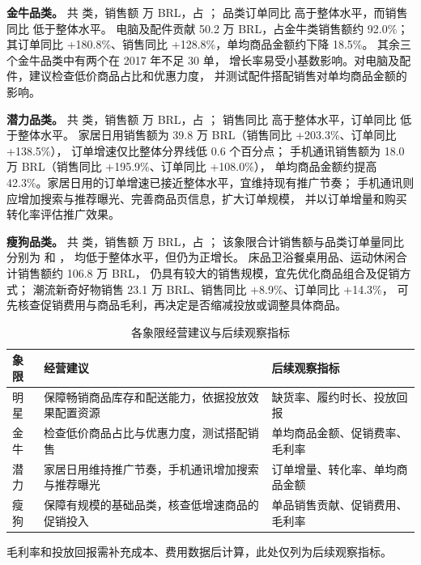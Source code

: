 \documentclass[11pt,a4paper]{ctexart}
\begin{document}
\noindent\textbf{金牛品类。}
共 \CowCount{} 类，销售额 \CowSales{} 万 BRL，占 \CowShare{}；
品类订单同比 \CowOrderGrowth{} 高于整体水平，而销售同比 \CowSalesGrowth{} 低于整体水平。
电脑及配件贡献 50.2 万 BRL，占金牛类销售额约 92.0\%；
其订单同比 +180.8\%、销售同比 +128.8\%，单均商品金额约下降 18.5\%。
其余三个金牛品类中有两个在 2017 年不足 30 单，
增长率易受小基数影响。对电脑及配件，建议检查低价商品占比和优惠力度，
并测试配件搭配销售对单均商品金额的影响。

\noindent\textbf{潜力品类。}
共 \PotentialCount{} 类，销售额 \PotentialSales{} 万 BRL，占 \PotentialShare{}；
销售同比 \PotentialSalesGrowth{} 高于整体水平，订单同比 \PotentialOrderGrowth{} 低于整体水平。
家居日用销售额为 39.8 万 BRL（销售同比 +203.3\%、订单同比 +138.5\%），
订单增速仅比整体分界线低 0.6 个百分点；
手机通讯销售额为 18.0 万 BRL（销售同比 +195.9\%、订单同比 +108.0\%），
单均商品金额约提高 42.3\%。家居日用的订单增速已接近整体水平，宜维持现有推广节奏；
手机通讯则应增加搜索与推荐曝光、完善商品页信息，扩大订单规模，
并以订单增量和购买转化率评估推广效果。

\noindent\textbf{瘦狗品类。}
共 \DogCount{} 类，销售额 \DogSales{} 万 BRL，占 \DogShare{}；
该象限合计销售额与品类订单量同比分别为 \DogSalesGrowth{} 和 \DogOrderGrowth{}，
均低于整体水平，但仍为正增长。
床品卫浴餐桌用品、运动休闲合计销售额约 106.8 万 BRL，
仍具有较大的销售规模，宜先优化商品组合及促销方式；
潮流新奇好物销售 23.1 万 BRL、销售同比 +8.9\%、订单同比 +14.3\%，
可先核查促销费用与商品毛利，再决定是否缩减投放或调整具体商品。

\begin{table}[H]
\centering
\caption{各象限经营建议与后续观察指标}
\small
\begin{tabular}{lp{7.2cm}p{5.5cm}}
\toprule
象限 & 经营建议 & 后续观察指标 \\
\midrule
明星 & 保障畅销商品库存和配送能力，依据投放效果配置资源 & 缺货率、履约时长、投放回报 \\
金牛 & 检查低价商品占比与优惠力度，测试搭配销售 & 单均商品金额、促销费率、毛利率 \\
潜力 & 家居日用维持推广节奏，手机通讯增加搜索与推荐曝光 & 订单增量、转化率、单均商品金额 \\
瘦狗 & 保障有规模的基础品类，核查低增速商品的促销投入 & 单品销售贡献、促销费用、毛利率 \\
\bottomrule
\end{tabular}
\end{table}
\noindent 毛利率和投放回报需补充成本、费用数据后计算，此处仅列为后续观察指标。
\end{document}
